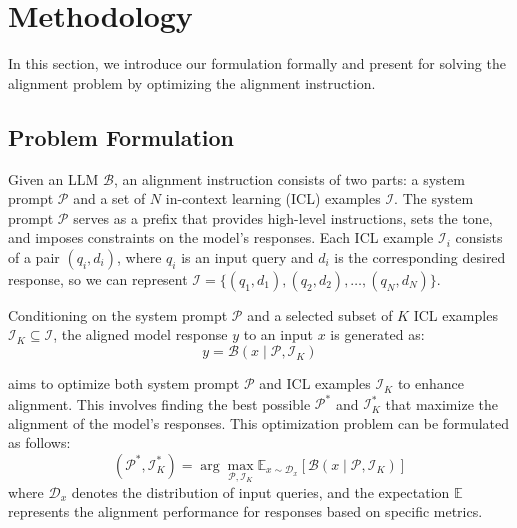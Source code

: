 \section{Methodology}
\vspace{-5pt}


In this section, we introduce our formulation formally and present \ours for solving the alignment problem by optimizing the alignment instruction.




\subsection{Problem Formulation}

Given an LLM $\mathcal{B}$, an alignment instruction consists of two parts: a system prompt $\mathcal{P}$ and a set of $N$ in-context learning (ICL) examples $\mathcal{I}$.
The system prompt $\mathcal{P}$ serves as a prefix that provides high-level instructions, sets the tone, and imposes constraints on the model's responses. Each ICL example $\mathcal{I}_i$ consists of a pair $(q_i, d_i)$, where $q_i$ is an input query and $d_i$ is the corresponding desired response, so we can represent $\mathcal{I} = \{(q_1, d_1), (q_2, d_2), \ldots, (q_N, d_N)\}$. 

Conditioning on the system prompt $\mathcal{P}$ and a selected subset of $K$ ICL examples $\mathcal{I}_K \subseteq \mathcal{I}$, the aligned model response $y$ to an input $x$ is generated as:
\[
y = \mathcal{B}(x \mid \mathcal{P}, \mathcal{I}_K)
\]

\ours aims to optimize both system prompt $\mathcal{P}$ and ICL examples $\mathcal{I}_K$ to enhance alignment. This involves finding the best possible $\mathcal{P}^*$ and $\mathcal{I}_K^*$ that maximize the alignment of the model's responses. This optimization problem can be formulated as follows:
\[
(\mathcal{P}^*, \mathcal{I}_K^*) = \arg\max_{\mathcal{P}, \mathcal{I}_K} \mathbb{E}_{x \sim \mathcal{D}_x} \left[\mathcal{B}(x \mid \mathcal{P}, \mathcal{I}_K) \right]
\]
\noindent where $\mathcal{D}_x$ denotes the distribution of input queries, and the expectation $\mathbb{E}$ represents the alignment performance for responses based on specific metrics.


